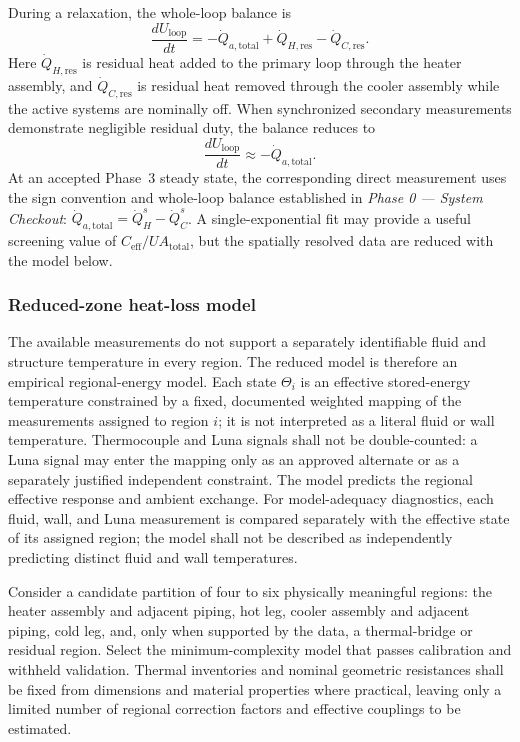 \documentclass[11pt]{article}
\newcommand{\QHs}{\dot Q_{H}^{s}}
\newcommand{\QCs}{\dot Q_{C}^{s}}
\newcommand{\PhaseZeroDoc}{\textit{Phase 0 --- System Checkout}}
\begin{document}
During a relaxation, the whole-loop balance is
\begin{equation}
    \frac{dU_{\mathrm{loop}}}{dt}
    =
    -\dot Q_{a,\mathrm{total}}
    +\dot Q_{H,\mathrm{res}}
    -\dot Q_{C,\mathrm{res}}.
\end{equation}
Here $\dot Q_{H,\mathrm{res}}$ is residual heat added to the primary loop through the heater assembly, and $\dot Q_{C,\mathrm{res}}$ is residual heat removed through the cooler assembly while the active systems are nominally off. When synchronized secondary measurements demonstrate negligible residual duty, the balance reduces to
\begin{equation}
    \frac{dU_{\mathrm{loop}}}{dt}
    \approx
    -\dot Q_{a,\mathrm{total}}.
    \label{eq:relax_balance}
\end{equation}
At an accepted Phase~3 steady state, the corresponding direct measurement uses the sign convention and whole-loop balance established in \PhaseZeroDoc: $\dot Q_{a,\mathrm{total}}=\QHs-\QCs$. A single-exponential fit may provide a useful screening value of $C_{\mathrm{eff}}/UA_{\mathrm{total}}$, but the spatially resolved data are reduced with the model below.

\subsubsection{Reduced-zone heat-loss model}
\label{sec:heat_loss}

The available measurements do not support a separately identifiable fluid and structure temperature in every region. The reduced model is therefore an empirical regional-energy model. Each state $\Theta_i$ is an effective stored-energy temperature constrained by a fixed, documented weighted mapping of the measurements assigned to region $i$; it is not interpreted as a literal fluid or wall temperature. Thermocouple and Luna signals shall not be double-counted: a Luna signal may enter the mapping only as an approved alternate or as a separately justified independent constraint. The model predicts the regional effective response and ambient exchange. For model-adequacy diagnostics, each fluid, wall, and Luna measurement is compared separately with the effective state of its assigned region; the model shall not be described as independently predicting distinct fluid and wall temperatures.

Consider a candidate partition of four to six physically meaningful regions: the heater assembly and adjacent piping, hot leg, cooler assembly and adjacent piping, cold leg, and, only when supported by the data, a thermal-bridge or residual region. Select the minimum-complexity model that passes calibration and withheld validation. Thermal inventories and nominal geometric resistances shall be fixed from dimensions and material properties where practical, leaving only a limited number of regional correction factors and effective couplings to be estimated.
\end{document}
